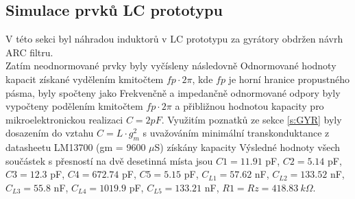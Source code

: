 \subsection{Simulace prvků LC prototypu}\label{s:ARC}
V této sekci byl náhradou induktorů v LC prototypu za gyrátory obdržen návrh ARC filtru.\\
Zatím neodnormované prvky byly vyčísleny následovně
\noindent Odnormované hodnoty kapacit získané vydělením kmitočtem $fp \cdot 2 \pi$, kde $fp$ je horní hranice propustného pásma, byly spočteny jako
\noindent Frekvenčně a impedančně odnormované odpory byly vypočteny podělením kmitočtem $fp \cdot 2 \pi$ a přibližnou hodnotou kapacity pro mikroelektronickou realizaci $C = 2 pF$.
\noindent Využitím poznatků ze sekce \ref{s:GYR} byly dosazením do vztahu $C = L \cdot g_m^2$ s uvažováním minimální transkonduktance z datasheetu LM13700 (gm = 9600 $\mu$S) získány kapacity 
\noindent Výsledné hodnoty všech součástek s přesností na dvě desetinná místa jsou $C1 = 11.91$ pF, $C2 = 5.14$ pF, $C3 = 12.3$ pF, $C4 = 672.74$ pF, $C5 = 5.15$ pF, $C_{L1} = 57.62 $ nF, $C_{L2} = 133.52$ nF, $C_{L3} = 55.8$ nF, $C_{L4} = 1019.9$ pF, $C_{L5} = 133.21$ nF, $R1 = Rz = 418.83\ k\Omega$.
